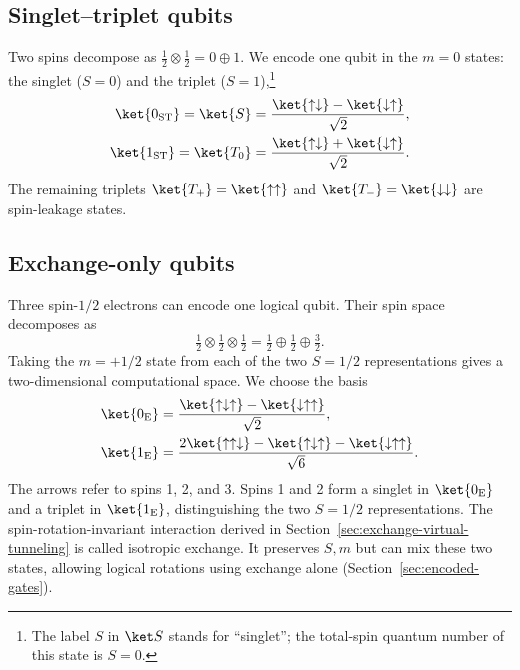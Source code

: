\subsection{Singlet--triplet qubits}
\label{sec:singlet-triplet-qubits}

Two spins decompose as $\tfrac12\otimes\tfrac12=0\oplus1$.
We encode one qubit in the $m=0$ states: the singlet ($S=0$) and
the triplet ($S=1$),\footnote{The label $S$ in $\ket S$ stands for
``singlet''; the total-spin quantum number of this state is $S=0$.}
\begin{equation}
  \begin{aligned}
    \ket{0_{\mathrm{ST}}}=\ket{S}
      &=\frac{\ket{\uparrow\downarrow}-\ket{\downarrow\uparrow}}{\sqrt{2}},\\
    \ket{1_{\mathrm{ST}}}=\ket{T_0}
      &=\frac{\ket{\uparrow\downarrow}+\ket{\downarrow\uparrow}}{\sqrt{2}}.
  \end{aligned}
  \label{eq:st-basis}
\end{equation}
The remaining triplets
$\ket{T_+}=\ket{\uparrow\uparrow}$ and
$\ket{T_-}=\ket{\downarrow\downarrow}$ are spin-leakage states.

\subsection{Exchange-only qubits}
\label{sec:exchange-only-qubits}

Three spin-$1/2$ electrons can encode one logical qubit. Their spin
space decomposes as
\[
 \tfrac12\otimes\tfrac12\otimes\tfrac12
   =\tfrac12\oplus\tfrac12\oplus\tfrac32.
\]
Taking the $m=+1/2$ state from each of the two $S=1/2$
representations gives a two-dimensional computational space.
We choose the basis
\begin{equation}
  \begin{aligned}
    \ket{0_{\mathrm E}}&=
       \frac{\ket{\uparrow\downarrow\uparrow}
             -\ket{\downarrow\uparrow\uparrow}}{\sqrt{2}},\\
    \ket{1_{\mathrm E}}&=
       \frac{2\ket{\uparrow\uparrow\downarrow}
             -\ket{\uparrow\downarrow\uparrow}
             -\ket{\downarrow\uparrow\uparrow}}{\sqrt{6}}.
  \end{aligned}
  \label{eq:exchange-only-basis}
\end{equation}
The arrows refer to spins 1, 2, and 3.
Spins 1 and 2 form a singlet in $\ket{0_{\mathrm E}}$ and a triplet
in $\ket{1_{\mathrm E}}$, distinguishing the two $S=1/2$ representations.
The spin-rotation-invariant interaction derived in
Section~\ref{sec:exchange-virtual-tunneling} is called isotropic exchange.
It preserves $S,m$ but can mix these two states, allowing logical
rotations using exchange alone (Section~\ref{sec:encoded-gates}).

